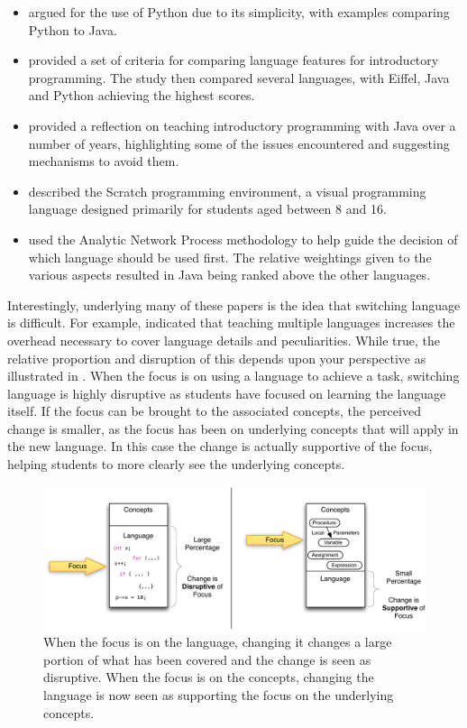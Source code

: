 \begin{itemize}[noitemsep,nolistsep]
	\item \citet{Mannila:2006} argued for the use of Python due to its simplicity, with examples comparing Python to Java.

	\item \citet{Mannila:2006a} provided a set of criteria for comparing language features for introductory programming. The study then compared several languages, with Eiffel, Java and Python achieving the highest scores.

	\item \citet{Pendergast:2006} provided a reflection on teaching introductory programming with Java over a number of years, highlighting some of the issues encountered and suggesting mechanisms to avoid them.

	\item \citet{Maloney:2010} described the Scratch programming environment, a visual programming language designed primarily for students aged between 8 and 16.

	\item \citet{Anik:2011} used the Analytic Network Process methodology to help guide the decision of which language should be used first. The relative weightings given to the various aspects resulted in Java being ranked above the other languages.
\end{itemize}

Interestingly, underlying many of these papers is the idea that switching language is difficult. For example, \citet{Brilliant:1996} indicated that teaching multiple languages increases the overhead necessary to cover language details and peculiarities. While true, the relative proportion and disruption of this depends upon your perspective as illustrated in . When the focus is on using a language to achieve a task, switching language is highly disruptive as students have focused on learning the language itself. If the focus can be brought to the associated concepts, the perceived change is smaller, as the focus has been on underlying concepts that will apply in the new language. In this case the change is actually supportive of the focus, helping students to more clearly see the underlying concepts.

\begin{figure}[htbp]
	\centering
	\includegraphics[width=\textwidth]{LanguageFocus}
	\caption{When the focus is on the language, changing it changes a large portion of what has been covered and the change is seen as disruptive. When the focus is on the concepts, changing the language is now seen as supporting the focus on the underlying concepts.}
	\label{fig:lang_focus}
\end{figure}

